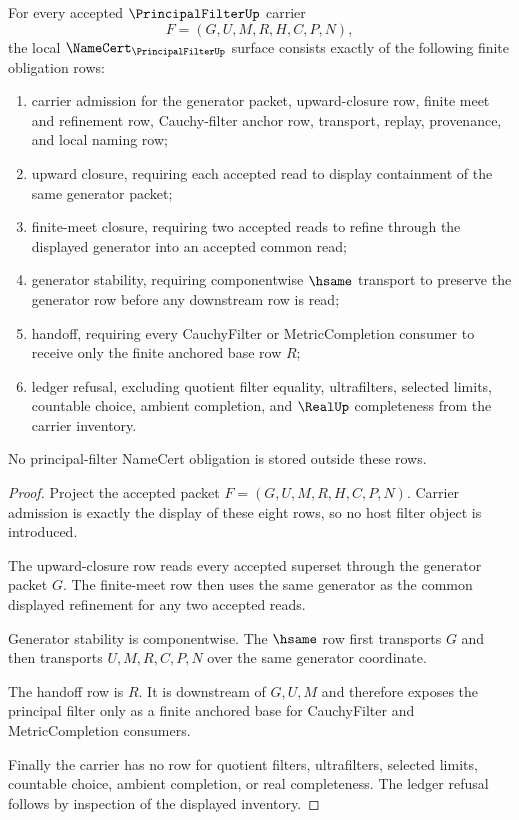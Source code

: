 \begin{theorem}
\label{thm:principal-filter-namecert-obligation-surface}
For every accepted $\PrincipalFilterUp$ carrier
$$
F=(G,U,M,R,H,C,P,N),
$$
the local $\NameCert_{\PrincipalFilterUp}$ surface consists exactly of the following finite obligation rows:
\begin{enumerate}
\item carrier admission for the generator packet, upward-closure row, finite meet and refinement row, Cauchy-filter anchor row, transport, replay, provenance, and local naming row;
\item upward closure, requiring each accepted read to display containment of the same generator packet;
\item finite-meet closure, requiring two accepted reads to refine through the displayed generator into an accepted common read;
\item generator stability, requiring componentwise $\hsame$ transport to preserve the generator row before any downstream row is read;
\item handoff, requiring every CauchyFilter or MetricCompletion consumer to receive only the finite anchored base row $R$;
\item ledger refusal, excluding quotient filter equality, ultrafilters, selected limits, countable choice, ambient completion, and $\RealUp$ completeness from the carrier inventory.
\end{enumerate}
No principal-filter NameCert obligation is stored outside these rows.
\end{theorem}
\begin{proof}
Project the accepted packet $F=(G,U,M,R,H,C,P,N)$. Carrier admission is exactly the display of these eight rows, so no host filter object is introduced.

The upward-closure row reads every accepted superset through the generator packet $G$. The finite-meet row then uses the same generator as the common displayed refinement for any two accepted reads.

Generator stability is componentwise. The $\hsame$ row first transports $G$ and then transports $U,M,R,C,P,N$ over the same generator coordinate.

The handoff row is $R$. It is downstream of $G,U,M$ and therefore exposes the principal filter only as a finite anchored base for CauchyFilter and MetricCompletion consumers.

Finally the carrier has no row for quotient filters, ultrafilters, selected limits, countable choice, ambient completion, or real completeness. The ledger refusal follows by inspection of the displayed inventory.
\end{proof}

